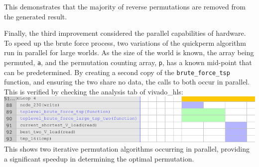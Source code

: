 \documentclass[a4paper, 11pt]{article}
\begin{document}
\FloatBarrier\noindent
This demonstrates that the majority of reverse permutations are removed from the
generated result. 
\par\bigskip\noindent
Finally, the third improvement considered the parallel capabilities 
of hardware. To speed up the brute force process, 
two variations of the quickperm algorithm run in parallel for large worlds. 
As the size of the world is known, the array being 
permuted, \texttt{a}, and the permutation counting array, \texttt{p}, has a known 
mid-point that can be predetermined. By creating a second copy of the 
\texttt{brute\_force\_tsp} function, and ensuring the two share no data, the calls 
to both occur in parallel. This is verified by checking the analysis tab of 
vivado\_hls:  \\
\includegraphics[width=\textwidth]{vivado_hls}
This shows two iterative permutation algorithms occurring in parallel, providing 
a significant speedup in determining the optimal permutation. 
\end{document}
